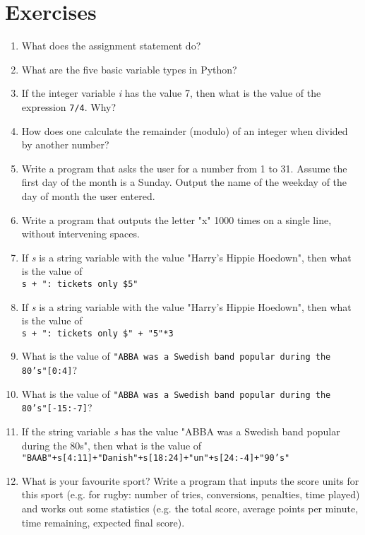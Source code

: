 \section{Exercises}
\begin{enumerate}
	\item What does the assignment statement do?
	\item What are the five basic variable types in Python?
	\item If the integer variable \textit{i} has the value 7, then what is    the value of the expression 
\texttt{7/4}. Why?
	\item How does one calculate the remainder (modulo) of an integer when    divided by another number?
	\item Write a program that asks the user for a number from 1 to 31.    Assume the first day of the month is a Sunday. Output the name of    the weekday of the day of month the user entered.
	\item Write a program that outputs the letter "x" 1000 times on a    single line, without intervening spaces.
	\item If \textit{s} is a string variable with the value "Harry's Hippie    Hoedown", then what is the value of
\\
\texttt{s + ": tickets only    \$5"}
	\item If \textit{s} is a string variable with the value "Harry's Hippie    Hoedown", then what is the value of
\\
\texttt{s + ": tickets only    \$" + "5"*3}
	\item What is the value of 
\texttt{"ABBA was a Swedish band popular during the    80's"[0:4]}?
	\item What is the value of 
\texttt{"ABBA was a Swedish band popular during the    80's"[-15:-7]}?
	\item If the string variable \textit{s} has the value "ABBA was a    Swedish band popular during the 80s", then what is the value of    
\\
\texttt{"BAAB"+s[4:11]+"Danish"+s[18:24]+"un"+s[24:-4]+"90's"}
	\item What is your favourite sport? Write a program that inputs the score       units for this sport (e.g. for rugby: number of tries, conversions,       penalties, time played) and works out some statistics (e.g. the total       score, average points per minute, time remaining, expected final score).    
\end{enumerate} 

